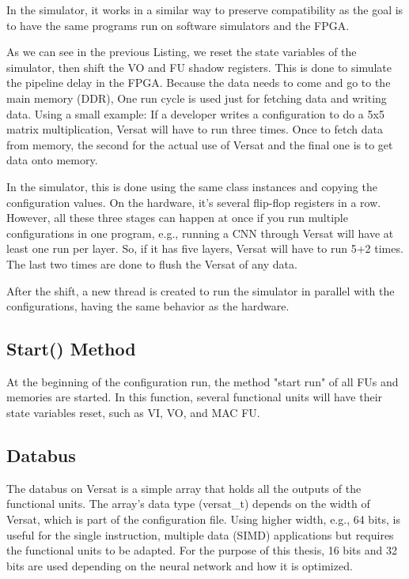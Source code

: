 In the simulator, it works in a similar way to preserve compatibility 
as the goal is to have the same
programs run on software simulators and the FPGA.



As we can see in the previous Listing, we reset the state variables of the simulator, then shift the VO and FU shadow registers.
This is done to simulate the pipeline delay in the FPGA. 
Because the data needs to come and go to the main memory (DDR),
One run cycle is used just for fetching data and writing data. 
Using a small example:
If a developer writes a configuration to do a 5x5 matrix multiplication, 
Versat will have to run three times.
Once to fetch data from memory, the second for the actual use of Versat 
and the final one is to get data onto memory.

In the simulator, this is done using the same class instances and 
copying the configuration values. On the hardware, it's several flip-flop registers in a row.
However, all these three stages can happen at once if you run multiple configurations in one program, e.g., running a CNN
through Versat will have at least one run per layer. 
So, if it has five layers, Versat will have to run 5+2 times. The last two times are done to
flush the Versat of any data.

After the shift, a new thread is created to run the simulator in parallel 
with the configurations,
having the same behavior as the hardware.

\subsection{Start() Method}

At the beginning of the configuration run, the method "start run" of 
all FUs and memories are started.
In this function, several functional units will have their state variables reset, such as VI, VO, and MAC FU.

\subsection{Databus}

The databus on Versat is a simple array that holds all the outputs of the functional units.
The array's data type (versat\_t) depends on the width of Versat, which is part of the configuration file.
Using higher width, e.g., 64 bits, is useful for the single instruction, multiple data (SIMD) 
applications but requires the functional units to be adapted.
For the purpose of this thesis, 16 bits and 32 bits are used depending 
on the neural network and how it is optimized.

